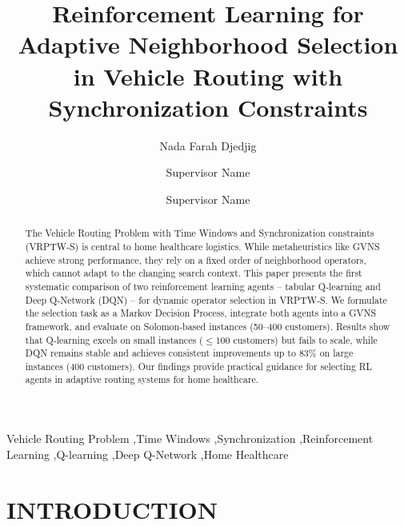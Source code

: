 \documentclass[final,11pt,times]{elsarticle}
\begin{document}
\begin{frontmatter}

\title{Reinforcement Learning for Adaptive Neighborhood Selection in Vehicle Routing with Synchronization Constraints}

\author[label1]{Nada Farah Djedjig}

\author[label1]{Supervisor Name}

\author[label1]{Supervisor Name}

\address[label1]{Department of Computer Science, University Name, City, Country}

\begin{abstract}
The Vehicle Routing Problem with Time Windows and Synchronization constraints (VRPTW‑S) is central to home healthcare logistics. While metaheuristics like GVNS achieve strong performance, they rely on a fixed order of neighborhood operators, which cannot adapt to the changing search context. This paper presents the first systematic comparison of two reinforcement learning agents – tabular Q‑learning and Deep Q‑Network (DQN) – for dynamic operator selection in VRPTW‑S. We formulate the selection task as a Markov Decision Process, integrate both agents into a GVNS framework, and evaluate on Solomon‑based instances (50–400 customers). Results show that Q‑learning excels on small instances ($\leq 100$ customers) but fails to scale, while DQN remains stable and achieves consistent improvements up to 83\% on large instances (400 customers). Our findings provide practical guidance for selecting RL agents in adaptive routing systems for home healthcare.
\end{abstract}

\begin{keyword}
Vehicle Routing Problem \sep Time Windows \sep Synchronization \sep Reinforcement Learning \sep Q-learning \sep Deep Q-Network \sep Home Healthcare
\end{keyword}

\end{frontmatter}
\thispagestyle{fancy}

\section{INTRODUCTION}
\label{sec:intro}
\end{document}
